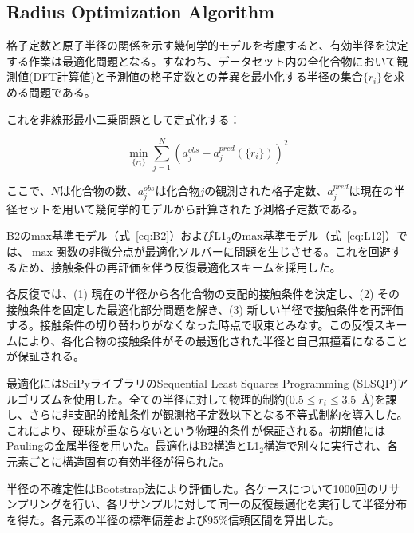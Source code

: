 \documentclass[a4paper,10pt,5p]{elsarticle}
\begin{document}
\subsection{Radius Optimization Algorithm}

格子定数と原子半径の関係を示す幾何学的モデルを考慮すると、有効半径を決定する作業は最適化問題となる。すなわち、データセット内の全化合物において観測値(DFT計算値)と予測値の格子定数との差異を最小化する半径の集合$\{r_i\}$を求める問題である。

これを非線形最小二乗問題として定式化する：



\begin{equation}
    \min_{\{r_i\}} \sum_{j=1}^{N} \left( a_j^{obs} - a_j^{pred}(\{r_i\}) \right)^2
    \label{eq:optimization}
\end{equation}

ここで、$N$は化合物の数、$a_j^{obs}$は化合物$j$の観測された格子定数、$a_j^{pred}$は現在の半径セットを用いて幾何学的モデルから計算された予測格子定数である。

B2のmax基準モデル（式~\ref{eq:B2}）およびL1$_2$のmax基準モデル（式~\ref{eq:L12}）では、$\max$関数の非微分点が最適化ソルバーに問題を生じさせる。これを回避するため、接触条件の再評価を伴う反復最適化スキームを採用した。

各反復では、(1) 現在の半径から各化合物の支配的接触条件を決定し、(2) その接触条件を固定した最適化部分問題を解き、(3) 新しい半径で接触条件を再評価する。接触条件の切り替わりがなくなった時点で収束とみなす。この反復スキームにより、各化合物の接触条件がその最適化された半径と自己無撞着になることが保証される。

最適化にはSciPyライブラリのSequential Least Squares Programming (SLSQP)アルゴリズムを使用した。全ての半径に対して物理的制約($0.5 \leq r_i \leq 3.5$~\AA)を課し、さらに非支配的接触条件が観測格子定数以下となる不等式制約を導入した。これにより、硬球が重ならないという物理的条件が保証される。初期値にはPaulingの金属半径を用いた。最適化はB2構造とL1$_2$構造で別々に実行され、各元素ごとに構造固有の有効半径が得られた。

半径の不確定性はBootstrap法により評価した。各ケースについて1000回のリサンプリングを行い、各リサンプルに対して同一の反復最適化を実行して半径分布を得た。各元素の半径の標準偏差および95\%信頼区間を算出した。
\end{document}
